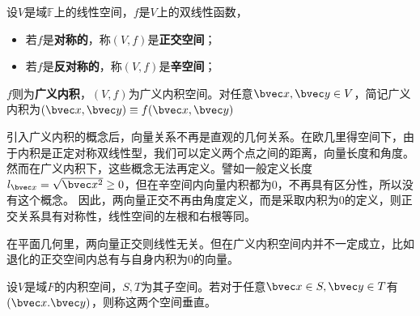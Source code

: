 \begin{definition}{}
设$V$是域$\mathbb F$上的线性空间，$f$是$V$上的双线性函数，
\begin{itemize}
\item 若$f$是\textbf{对称的}，称$(V,f)$是\textbf{正交空间}；
\item 若$f$是\textbf{反对称的}，称$(V,f)$是\textbf{辛空间}；
\end{itemize}
$f$则为\textbf{广义内积}，$(V,f)$为广义内积空间。对任意$\bvec x,\bvec y\in V$，简记广义内积为$(\bvec x,\bvec y)\equiv f(\bvec x,\bvec y)$
\end{definition}
引入广义内积的概念后，向量关系不再是直观的几何关系。在欧几里得空间下，由于内积是正定对称双线性型，我们可以定义两个点之间的距离，向量长度和角度。然而在广义内积下，这些概念无法再定义。譬如一般定义长度$l_{\bvec x}=\sqrt{\bvec x^2}\ge 0$，但在辛空间内向量内积都为0，不再具有区分性，所以没有这个概念。
因此，两向量正交不再由角度定义，而是采取内积为$0$的定义，则正交关系具有对称性，线性空间的左根和右根等同。

在平面几何里，两向量正交则线性无关。但在广义内积空间内并不一定成立，比如退化的正交空间内总有与自身内积为0的向量。
\begin{definition}{}
设$V$是域$F$的内积空间，$S,T$为其子空间。若对于任意$\bvec x\in S,\bvec  y\in T$有$(\bvec x.\bvec y)$，则称这两个空间垂直。
\end{definition}
